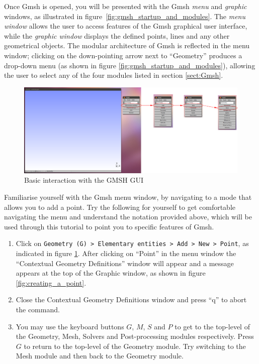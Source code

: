 Once Gmsh is opened, you will be presented with the Gmsh \emph{menu} and \emph{graphic} windows, as
illustrated in figure~\ref{fig:gmsh_startup_and_modules}.
The \emph{menu window} allows the user to access features of the Gmsh graphical user interface, while
the \emph{graphic window} displays the defined points, lines and any other geometrical objects. The
modular architecture of Gmsh is reflected in the menu window; clicking on the down-pointing arrow next
to ``Geometry'' produces a drop-down menu (as shown in figure \ref{fig:gmsh_startup_and_modules}),
allowing the user to select any of the four modules listed in section \ref{sect:Gmsh}.
\begin{figure}[htbp!]
 \centering
  \includegraphics[width=1.0\textwidth]{../figures/getting_started.png}
  \caption{Basic interaction with the GMSH GUI}
  \label{fig:basic_interaction}
\end{figure}
Familiarise yourself with the Gmsh menu window, by navigating to a mode that allows you to add a point.
Try the following for yourself to get comfortable navigating the menu and understand the notation
provided above, which will be used through this tutorial to point you to specific features of Gmsh.
\begin{enumerate}
  \item Click on \lstinline{Geometry (G) > Elementary entities > Add > New > Point}, as indicated in
        figure \ref{fig:basic_interaction}. After clicking on ``Point'' in the menu window the 
        ``Contextual Geometry Definitions'' window will appear and a message appears at the top
        of the Graphic window, as shown in figure \ref{fig:creating_a_point}.
  \item Close the Contextual Geometry Definitions window and press ``q'' to abort the command.
  \item You may use the keyboard buttons $G$, $M$, $S$ and $P$ to get to the top-level of the
        Geometry, Mesh, Solvers and Post-processing modules respectively. Press $G$ to return to
        the top-level of the Geometry module. Try switching to the Mesh module and then back to
        the Geometry module.
\end{enumerate}

